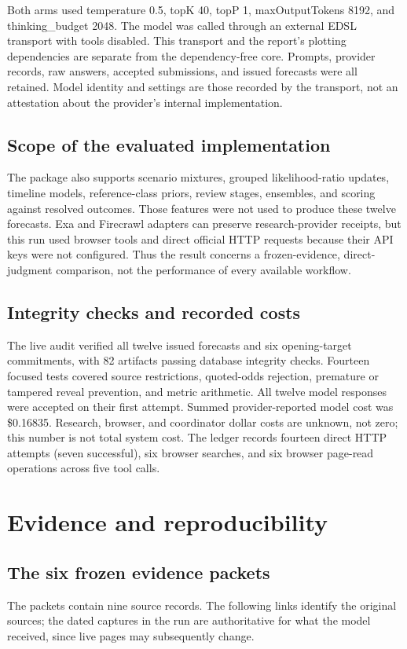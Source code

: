 \documentclass[11pt,letterpaper]{article}
\begin{document}
Both arms used temperature 0.5, topK 40, topP 1, maxOutputTokens 8192, and
thinking\_budget 2048. The model was called through an external EDSL transport
with tools disabled. This transport and the report's plotting dependencies are
separate from the dependency-free core. Prompts, provider records, raw answers,
accepted submissions, and issued forecasts were all retained. Model identity
and settings are those recorded by the transport, not an attestation about the
provider's internal implementation.

\subsection{Scope of the evaluated implementation}
The package also supports scenario mixtures, grouped likelihood-ratio updates,
timeline models, reference-class priors, review stages, ensembles, and scoring
against resolved outcomes. Those features were not used to produce these twelve
forecasts. Exa and Firecrawl adapters can preserve research-provider receipts,
but this run used browser tools and direct official HTTP requests because their
API keys were not configured. Thus the result concerns a frozen-evidence,
direct-judgment comparison, not the performance of every available workflow.

\subsection{Integrity checks and recorded costs}
The live audit verified all twelve issued forecasts and six opening-target
commitments, with 82 artifacts passing database integrity checks. Fourteen
focused tests covered source restrictions, quoted-odds rejection, premature or
tampered reveal prevention, and metric arithmetic. All twelve model responses
were accepted on their first attempt. Summed provider-reported model cost was
\$0.16835. Research, browser, and coordinator dollar costs are unknown,
not zero; this number is not total system cost. The ledger records fourteen
direct HTTP attempts (seven successful), six browser searches, and six browser
page-read operations across five tool calls.

\section{Evidence and reproducibility}
\label{app:evidence}
\subsection{The six frozen evidence packets}
The packets contain nine source records. The following links identify the
original sources; the dated captures in the run are authoritative for what the
model received, since live pages may subsequently change.
\end{document}
